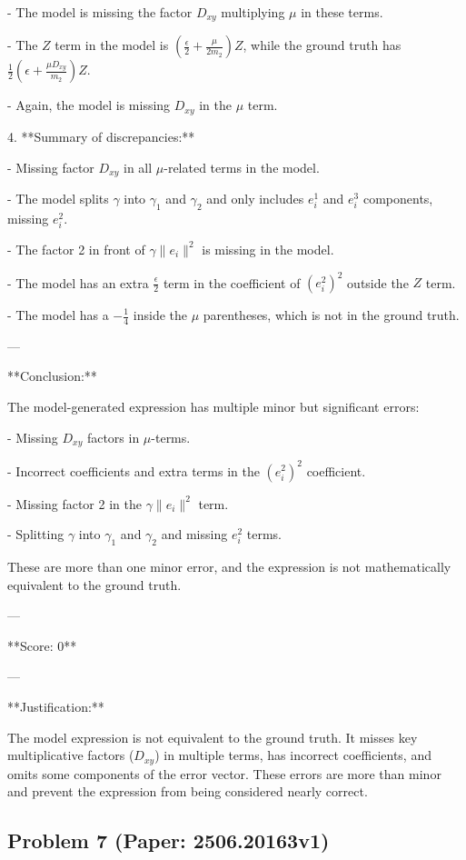 \documentclass[10pt]{article}
\begin{document}
  - The model is missing the factor \(D_{xy}\) multiplying \(\mu\) in these terms.

  - The \(Z\) term in the model is \(\left( \frac{\epsilon}{2} + \frac{\mu}{2 m_2} \right) Z\), while the ground truth has \(\frac{1}{2} \left( \epsilon + \frac{\mu D_{xy}}{m_2} \right) Z\).

  - Again, the model is missing \(D_{xy}\) in the \(\mu\) term.

4. **Summary of discrepancies:**

- Missing factor \(D_{xy}\) in all \(\mu\)-related terms in the model.

- The model splits \(\gamma\) into \(\gamma_1\) and \(\gamma_2\) and only includes \(e_i^1\) and \(e_i^3\) components, missing \(e_i^2\).

- The factor 2 in front of \(\gamma \|e_i\|^2\) is missing in the model.

- The model has an extra \(\frac{\epsilon}{2}\) term in the coefficient of \((e_i^2)^2\) outside the \(Z\) term.

- The model has a \(-\frac{1}{4}\) inside the \(\mu\) parentheses, which is not in the ground truth.

---

**Conclusion:**

The model-generated expression has multiple minor but significant errors:

- Missing \(D_{xy}\) factors in \(\mu\)-terms.

- Incorrect coefficients and extra terms in the \((e_i^2)^2\) coefficient.

- Missing factor 2 in the \(\gamma \|e_i\|^2\) term.

- Splitting \(\gamma\) into \(\gamma_1\) and \(\gamma_2\) and missing \(e_i^2\) terms.

These are more than one minor error, and the expression is not mathematically equivalent to the ground truth.

---

**Score: 0**

---

**Justification:**

The model expression is not equivalent to the ground truth. It misses key multiplicative factors (\(D_{xy}\)) in multiple terms, has incorrect coefficients, and omits some components of the error vector. These errors are more than minor and prevent the expression from being considered nearly correct.

\newpage
\subsection*{Problem 7 (Paper: 2506.20163v1)}
\end{document}
